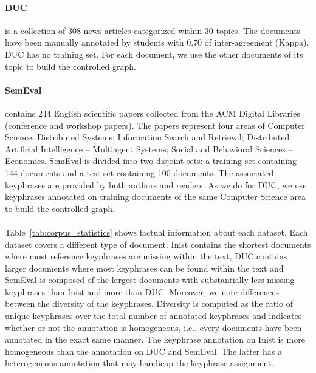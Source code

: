     \paragraph{DUC~\textnormal{\cite{wan2008expandrank}}} is a collection of 308
    news articles categorized within 30 topics. The documents have been manually
    annotated by students with 0.70 of inter-agreement (Kappa). DUC has no
    training set. For each document, we use the other
    documents of its topic to build the controlled graph.

    \paragraph{SemEval~\textnormal{\cite{kim2010semeval}}} contains 244 English
    scientific papers collected from the ACM Digital Libraries (conference and
    workshop papers). The papers represent four areas of Computer Science:
    Distributed Systems; Information Search and Retrieval; Distributed
    Artificial Intelligence -- Multiagent Systems; Social and Behavioral
    Sciences -- Economics. SemEval is divided into two disjoint sets: a training
    set containing 144 documents and a test set containing 100 documents. The
    associated keyphrases are provided by both authors and readers. As we do for
    DUC, we use keyphrases annotated on training documents of the same Computer Science
    area to build the controlled graph.

    \paragraph{}
    Table~\ref{tab:corpus_statistics} shows factual information about each
    dataset. Each dataset covers a different type of document. Inist contains the
    shortest documents where most reference keyphrases are missing within the text,
    DUC contains larger documents where most keyphrases can be found within the text
    and SemEval is composed of the largest documents with substantially less missing
    keyphrases than Inist and more than DUC. Moreover, we note differences
    between the diversity of the keyphrases. Diversity is computed as the ratio of
    unique keyphrases over the total number of annotated keyphrases and indicates
    whether or not the annotation is homogeneous, i.e., every documents have been annotated
    in the exact same manner. The keyphrase annotation on Inist is more homogeneous than
    the annotation on DUC and SemEval. The latter has a heterogeneous annotation that may
    handicap the keyphrase assignment.
    

